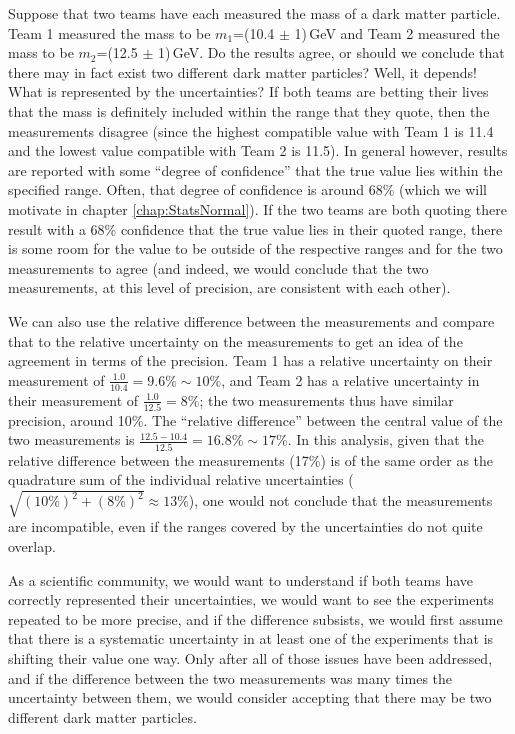 Suppose that two teams have each measured the mass of a dark matter particle. Team 1 measured the mass to be $m_1$=(10.4 $\pm$ 1)\,GeV and Team 2 measured the mass to be $m_2$=(12.5 $\pm$ 1)\,GeV. Do the results agree, or should we conclude that there may in fact exist two different dark matter particles? Well, it depends! What is represented by the uncertainties? If both teams are betting their lives that the mass is definitely included within the range that they quote, then the measurements disagree (since the highest compatible value with Team 1 is 11.4 and the lowest value compatible with Team 2 is 11.5). In general however, results are reported with some ``degree of confidence'' that the true value lies within the specified range. Often, that degree of confidence is around 68\% (which we will motivate in chapter \ref{chap:StatsNormal}). If the two teams are both quoting there result with a 68\% confidence that the true value lies in their quoted range, there is some room for the value to be outside of the respective ranges and for the two measurements to agree (and indeed, we would conclude that the two measurements, at this level of precision, are consistent with each other).

We can also use the relative difference between the measurements and compare that to the relative uncertainty on the measurements to get an idea of the agreement in terms of the precision. Team 1 has a relative uncertainty on their measurement of $\frac{1.0}{10.4}=9.6\%\sim 10\%$, and Team 2 has a relative uncertainty in their measurement of $\frac{1.0}{12.5}=8\%$; the two measurements thus have similar precision, around 10\%. The ``relative difference'' between the central value of the two measurements is $\frac{12.5-10.4}{12.5} = 16.8\% \sim 17\%$. In this analysis, given that the relative difference between the measurements (17\%) is of the same order as the quadrature sum of the individual relative uncertainties ($\sqrt{(10\%)^2+(8\%)^2}\approx 13\%$), one would not conclude that the measurements are incompatible, even if the ranges covered by the uncertainties do not quite overlap.

As a scientific community, we would want to understand if both teams have correctly represented their uncertainties, we would want to see the experiments repeated to be more precise, and if the difference subsists, we would first assume that there is a systematic uncertainty in at least one of the experiments that is shifting their value one way. Only after all of those issues have been addressed, and if the difference between the two measurements was many times the uncertainty between them, we would consider accepting that there may be two different dark matter particles.

